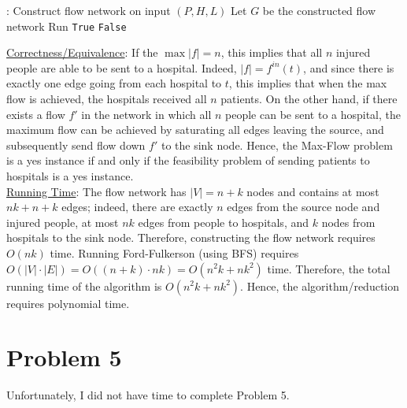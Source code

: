 \documentclass[twoside,11pt]{homework}
\newcommand\NoProc{\renewcommand\algorithmicprocedure{}}
\begin{document}
\begin{algorithm}
\begin{algorithmic}[1]
\NoProc
{}:  
\State Construct flow network on input $(P, H, L)$  
\State Let $G$ be the constructed flow network
\State Run 
\State \Return \texttt{True}
\State \Return \texttt{False}
\EndIf
\EndProcedure 
\end{algorithmic}
\end{algorithm}


\noindent
\underline{Correctness/Equivalence}:  If the $\max |f| = n$,  this implies that all $n$ injured people are able to be sent to a hospital.  Indeed,  $|f| = f^{in}(t)$,  and since there is exactly one edge going from each hospital to $t$, this implies that when the max flow is achieved, the hospitals received all $n$ patients.  On the other hand,  if there exists a flow $f'$ in the network in which all $n$ people can be sent to a hospital,  the maximum flow can be achieved by saturating all edges leaving the source,  and subsequently send flow down $f'$ to the sink node.  Hence,  the Max-Flow problem is a yes instance if and only if the feasibility problem of sending patients to hospitals is a yes instance.  \\

\noindent
\underline{Running Time}:  The flow network has $|V| = n + k$ nodes and contains at most $nk + n + k$ edges; indeed,  there are exactly $n$ edges from the source node and injured people,  at most $nk$ edges from people to hospitals, and $k$ nodes from hospitals to the sink node.  Therefore,  constructing the flow network requires $O(nk)$ time.  Running Ford-Fulkerson (using BFS) requires $O(|V| \cdot |E|) = O((n+k) \cdot nk)  = O(n^2k + nk^2)$ time.  Therefore, the total running time of the algorithm is $O(n^2k + nk^2)$. Hence,  the algorithm/reduction requires polynomial time.


 


\section*{Problem 5}
Unfortunately,  I did not have time to complete Problem 5.  \\



%
%
\end{document}
